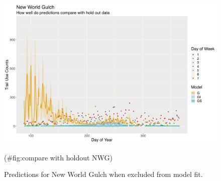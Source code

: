 \documentclass[
]{book}
\begin{document}
\begin{figure}

{\centering \includegraphics[width=1\linewidth]{../figures/NWG_pred_compare} 

}

\caption{Predictions for New World Gulch when excluded from model fit.}(\#fig:compare with holdout NWG)
\end{figure}

  
\end{document}
